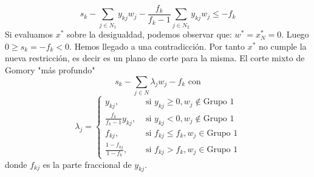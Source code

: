 \documentclass[PM.tex]{subfiles}
\begin{document}
\[ s_k-\sum_{j \in N_1} y_{kj} w_j - \frac{f_k}{f_k -1} \sum_{j \in N_2} y_{kj} w_j ≤ -f_k \]
Si evaluamos $x^*$ sobre la desigualdad, podemos observar que: $w^* = x_N^* = 0$. Luego $0 ≥ s_k = -f_k < 0$. Hemos llegado a una contradicción. Por tanto $x^*$ no cumple la nueva restricción, es decir es un plano de corte para la misma. El corte mixto de Gomory "más profundo"
\[ s_k - \sum_{j \in N} λ_j w_j - f_k \text{ con}\]
\[ λ_j = \begin{cases}
	y_{kj}, &\text{ si }y_{kj} ≥ 0, w_j \notin \text{Grupo 1}\\
	\frac{f_k}{f_k-1}y_{kj}, &\text{ si }y_{kj} < 0, w_j \notin \text{Grupo 1}\\
	f_{kj}, &\text{ si } f_{kj} ≤ f_k, w_j \in \text{Grupo 1}\\
	\frac{1-f_{kj}}{1-f_k} ,&\text{ si } f_{kj} > f_k, w_j \in \text{Grupo 1}
\end{cases}\]
donde $f_{kj}$ es la parte fraccional de $y_{kj}$.
\end{document}
